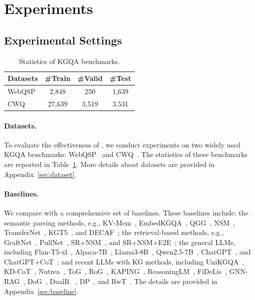 
\section{Experiments}

\subsection{Experimental Settings}

\begin{table}[t]
\centering
\label{tab:dataset_statistics}
\begin{tabular}{lccc}
\toprule
\textbf{Datasets} & \textbf{\#Train} & \textbf{\#Valid} & \textbf{\#Test} \\
\midrule
WebQSP     & 2,848   & 250    & 1,639  \\
\midrule
CWQ        & 27,639  & 3,519  & 3,531   \\
\bottomrule
\end{tabular}
\caption{Statistics of KGQA benchmarks.}

\label{tab:datasets}
\end{table}

\paragraph{Datasets.}
To evaluate the effectiveness of \method{}, we conduct experiments on two widely used KGQA benchmarks: WebQSP~\cite{talmor2018web} and CWQ~\cite{yih2016value}. The statistics of these benchmarks are reported in Table~\ref{tab:datasets}. More details about datasets are provided in Appendix~\ref{sec:dataset}.


\paragraph{Baselines.} We compare \method{} with a comprehensive set of baselines. These baselines include: the semantic parsing methods, e.g., KV-Mem~\citep{miller2016key}, EmbedKGQA~\citep{saxena2020improving}, QGG~\citep{lan2020query}, NSM~\citep{he2021improving}, TransferNet~\citep{shi2021transfernet}, KGT5~\citep{saxena2022sequence}, and DECAF~\citep{yu2022decaf};
the retrieval-based methods, e.g., GraftNet~\citep{sun2018open}, PullNet~\citep{sun2019pullnet}, SR+NSM~\citep{zhang2022subgraph}, and SR+NSM+E2E~\citep{zhang2022subgraph};
the general LLMs, including 
Flan-T5-xl~\citep{chung2024scaling}, Alpaca-7B~\citep{taori2023stanford},
Llama3-8B~\citep{dubey2024llama}, Qwen2.5-7B~\citep{team2024qwen2}, ChatGPT~\citep{schulman2022chatgpt}, and ChatGPT+CoT~\citep{wei2022chain};
and recent LLMs with KG methods, including UniKGQA~\citep{jiang2022unikgqa}, KD-CoT~\citep{wang2023knowledge},
Nutrea~\citep{choi2023nutrea}, ToG~\citep{sun2023think}, RoG~\citep{luo2023reasoning}, KAPING~\citep{baek2023knowledge}, ReasoningLM~\citep{jiang2023reasoninglm},
FiDeLis~\citep{sui2024fidelis}, GNN-RAG~\citep{mavromatis2024gnn},
DoG~\citep{ma2025debate},  DualR~\citep{liu2025dual}
, DP~\citep{ma2025deliberation}, and RwT~\citep{shen2025reasoning}. The details are provided in Appendix~\ref{sec:baseline}.

